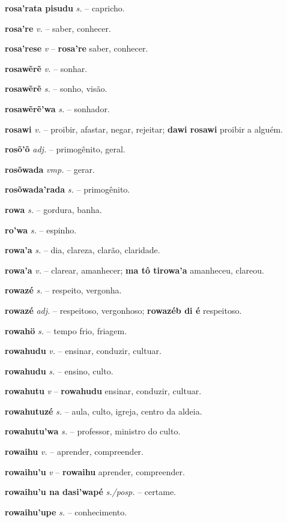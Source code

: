 \textbf{rosa'rata pisudu} \textit{s.} -- capricho.

\textbf{rosa're} \textit{v.} -- saber, conhecer.

\textbf{rosa'rese} \textit{v} -- \textbf{rosa're} saber, conhecer.

\textbf{rosawẽrẽ} \textit{v.} -- sonhar.

\textbf{rosawẽrẽ} \textit{s.} -- sonho, visão.

\textbf{rosawẽrẽ'wa} \textit{s.} -- sonhador.

\textbf{rosawi} \textit{v.} -- proibir, afastar, negar, rejeitar; \textbf{dawi rosawi} proibir a alguém.

\textbf{rosõ'õ} \textit{adj.} -- primogênito, geral.

\textbf{rosõwada} \textit{vmp.} -- gerar.

\textbf{rosõwada'rada} \textit{s.} -- primogênito.

\textbf{rowa} \textit{s.} -- gordura, banha.

\textbf{ro'wa} \textit{s.} -- espinho.

\textbf{rowa'a} \textit{s.} -- dia, clareza, clarão, claridade.

\textbf{rowa'a} \textit{v.} -- clarear, amanhecer; \textbf{ma tô tirowa'a} amanheceu, clareou.

\textbf{rowazé} \textit{s.} -- respeito, vergonha.

\textbf{rowazé} \textit{adj.} -- respeitoso, vergonhoso; \textbf{rowazéb di é} respeitoso.

\textbf{rowahö} \textit{s.} -- tempo frio, friagem.

\textbf{rowahudu} \textit{v.} -- ensinar, conduzir, cultuar.

\textbf{rowahudu} \textit{s.} -- ensino, culto.

\textbf{rowahutu} \textit{v} -- \textbf{rowahudu} ensinar, conduzir, cultuar.

\textbf{rowahutuzé} \textit{s.} -- aula, culto, igreja, centro da aldeia.

\textbf{rowahutu'wa} \textit{s.} -- professor, ministro do culto.

\textbf{rowaihu} \textit{v.} -- aprender, compreender.

\textbf{rowaihu'u} \textit{v} -- \textbf{rowaihu} aprender, compreender.

\textbf{rowaihu'u na dasi'wapé} \textit{s./posp.} -- certame.

\textbf{rowaihu'upe} \textit{s.} -- conhecimento.

